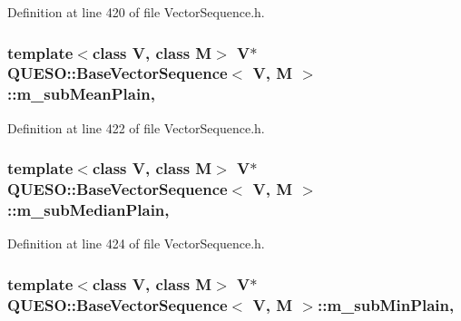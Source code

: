 Definition at line 420 of file Vector\-Sequence.\-h.

\hypertarget{class_q_u_e_s_o_1_1_base_vector_sequence_aea341eac0220157a44f373e1377e0ca0}{
\subsubsection[{m\-\_\-sub\-Mean\-Plain}]{\setlength{\rightskip}{0pt plus 5cm}template$<$class V, class M$>$ V$\ast$ {\bf Q\-U\-E\-S\-O\-::\-Base\-Vector\-Sequence}$<$ V, M $>$\-::m\-\_\-sub\-Mean\-Plain\hspace{0.3cm}{\ttfamily [mutable]}, {\ttfamily [protected]}}}\label{class_q_u_e_s_o_1_1_base_vector_sequence_aea341eac0220157a44f373e1377e0ca0}


Definition at line 422 of file Vector\-Sequence.\-h.

\hypertarget{class_q_u_e_s_o_1_1_base_vector_sequence_a99ab57b8cb62b14eedd606b9d2e75672}{
\subsubsection[{m\-\_\-sub\-Median\-Plain}]{\setlength{\rightskip}{0pt plus 5cm}template$<$class V, class M$>$ V$\ast$ {\bf Q\-U\-E\-S\-O\-::\-Base\-Vector\-Sequence}$<$ V, M $>$\-::m\-\_\-sub\-Median\-Plain\hspace{0.3cm}{\ttfamily [mutable]}, {\ttfamily [protected]}}}\label{class_q_u_e_s_o_1_1_base_vector_sequence_a99ab57b8cb62b14eedd606b9d2e75672}


Definition at line 424 of file Vector\-Sequence.\-h.

\hypertarget{class_q_u_e_s_o_1_1_base_vector_sequence_ab4be9e46882547032a1b738b6fafc2f8}{
\subsubsection[{m\-\_\-sub\-Min\-Plain}]{\setlength{\rightskip}{0pt plus 5cm}template$<$class V, class M$>$ V$\ast$ {\bf Q\-U\-E\-S\-O\-::\-Base\-Vector\-Sequence}$<$ V, M $>$\-::m\-\_\-sub\-Min\-Plain\hspace{0.3cm}{\ttfamily [mutable]}, {\ttfamily [protected]}}}\label{class_q_u_e_s_o_1_1_base_vector_sequence_ab4be9e46882547032a1b738b6fafc2f8}


